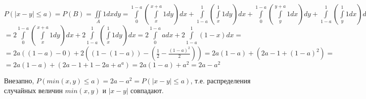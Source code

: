 \documentclass{article}
\begin{document}
\begin{center}
		$P(|x-y| \leq a) = P(B) = \iint\limits_A1dxdy 
		= \int\limits_0^{1-a} \left( \int\limits_x^{x+a} 1dy \right)dx + \int\limits_{1-a}^{1} \left( \int\limits_x^{1} 1dy \right)dx
		 + \int\limits_0^{1-a} \left( \int\limits_y^{y+a} 1dx \right)dy + \int\limits_{1-a}^{1} \left( \int\limits_y^{1} 1dx \right)dy = $ \\ \vspace{5px}
		 $= 2\int\limits_0^{1-a} \left( \int\limits_x^{x+a} 1dy \right)dx + 2\int\limits_{1-a}^{1} \left( \int\limits_x^{1} 1dy \right)dx
		 = 2\int\limits_0^{1-a} adx + 2\int\limits_{1-a}^{1} \left( 1-x \right)dx =$ \\
		 $=2a\left((1-a)-0\right) + 2\left(\left(1 - (1-a)\right) - \left(\frac{1}{2} - \frac{(1-a)^2}{2}\right)\right) 
		 = 2a\left(1-a\right) + \left(2a - 1 + (1-a)^2\right) = $ \\
		 $= 2a(1-a) + (2a - 1 + 1 - 2a + a^a) = 2a(1-a) + a^2 = 2a - a^2$
	\end{center}
	Внезапно, $P(min(x, y) \leq a)= 2a - a^2 = P(|x-y| \leq a)$, т.е. распределения случайных величин $min(x, y)$ и $|x-y|$ совпадают.
	
\end{document}
